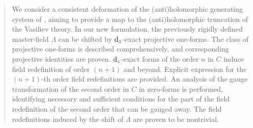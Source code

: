 \documentclass[12pt]{article}
\newcommand{\dr}{{{\rm d}}}
\begin{document}
\begin{abstract}
\noindent %



\noindent We consider a consistent deformation of the (anti)holomorphic generating system of \cite{Didenko:2022qga}, aiming to provide a map to the (anti)holomorphic truncation of the Vasiliev theory. In our new formulation, the previously rigidly defined  master-field $\Lambda$ can be shifted by $\dr_z$-exact projective one-forms. The class of projective one-forms is described comprehensively, and corresponding projective identities are proven. $\dr_z$-exact forms of the order $n$ in $C$ induce field redefinition of order $(n+1)$ and beyond. Explicit expression for the $(n+1)$-th order field redefinitions are provided. An analysis of the gauge transformation of the second order in $C$ in zero-forms is performed, identifying necessary and sufficient conditions for the part of the field redefinition of the second order that can be gauged away. The field redefinitions induced by the shift of $\Lambda$ are proven to be nontrivial.
\end{abstract}
\newpage



\newpage

\tableofcontents
\end{document}
